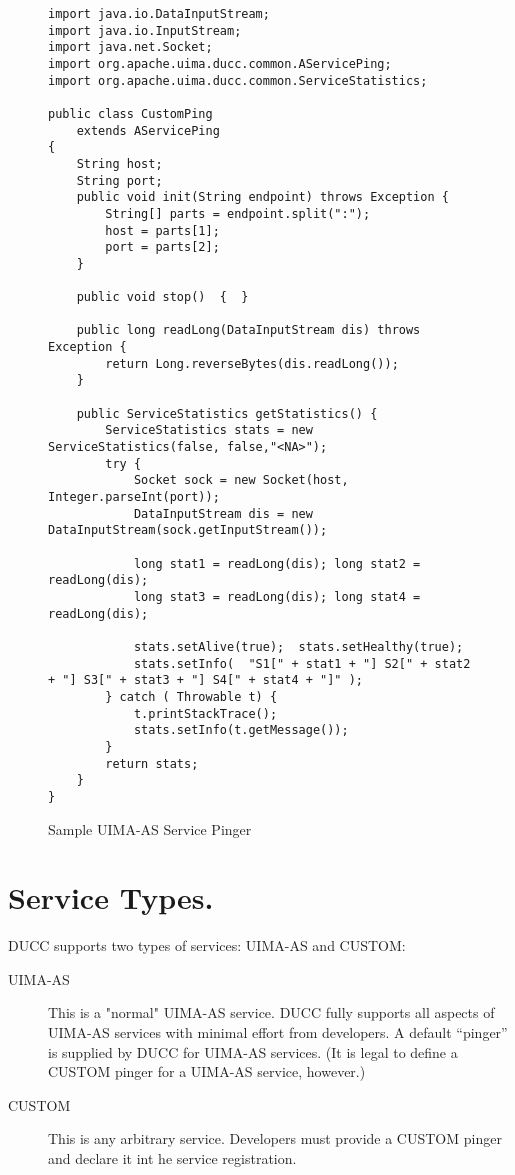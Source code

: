       \begin{figure}[H]
\begin{verbatim}
import java.io.DataInputStream;
import java.io.InputStream;
import java.net.Socket;
import org.apache.uima.ducc.common.AServicePing;
import org.apache.uima.ducc.common.ServiceStatistics;

public class CustomPing
    extends AServicePing
{
    String host;
    String port;
    public void init(String endpoint) throws Exception {
        String[] parts = endpoint.split(":");
        host = parts[1];
        port = parts[2];
    }

    public void stop()  {  }

    public long readLong(DataInputStream dis) throws Exception {
        return Long.reverseBytes(dis.readLong());
    }

    public ServiceStatistics getStatistics() {
        ServiceStatistics stats = new ServiceStatistics(false, false,"<NA>");
        try {
            Socket sock = new Socket(host, Integer.parseInt(port));
            DataInputStream dis = new DataInputStream(sock.getInputStream());

            long stat1 = readLong(dis); long stat2 = readLong(dis); 
            long stat3 = readLong(dis); long stat4 = readLong(dis);

            stats.setAlive(true);  stats.setHealthy(true);
            stats.setInfo(  "S1[" + stat1 + "] S2[" + stat2 + "] S3[" + stat3 + "] S4[" + stat4 + "]" );
        } catch ( Throwable t) {
        	t.printStackTrace();
            stats.setInfo(t.getMessage());
        }
        return stats;        
    }
}
\end{verbatim}
        \caption{} Sample UIMA-AS Service Pinger
        \label{CUSTOM-PINGER}

      \end{figure}
      

     \section{Service Types.}
      DUCC supports two types of services: UIMA-AS and CUSTOM:
      
      \begin{description}
          \item[UIMA-AS] This is a "normal" UIMA-AS service. DUCC fully supports all aspects of UIMA-AS
            services with minimal effort from developers.  A default ``pinger'' is supplied by DUCC
            for UIMA-AS services.  (It is legal to define a CUSTOM pinger for a UIMA-AS service,
            however.)
            
          \item[CUSTOM] This is any arbitrary service.  Developers must provide a CUSTOM pinger
            and declare it int he service registration.            
      \end{description}

